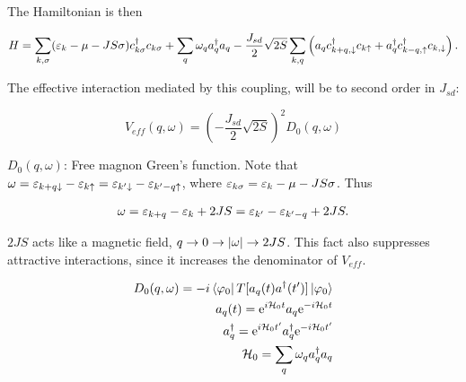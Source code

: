  The Hamiltonian is then
 
 \begin{align*}
 H = \sum_{k,\sigma} (\varepsilon_k - \mu - JS\sigma)c^{\dagger}_{k\sigma} c_{k\sigma} + \sum_q \omega_q a^{\dagger}_q a_q - \frac{J_{sd}}{2}\sqrt{2S}\sum_{k,q} \left( a_q c^{\dagger}_{k+q,\downarrow} c_{k\uparrow} + a^{\dagger}_q c^{\dagger}_{k-q,\uparrow} c_{k,\downarrow}\right).
 \end{align*}
 
 The effective interaction mediated by this coupling, will be to second order in $J_{sd}$:
 
 \begin{center}
 \end{center}
 
 \begin{equation}
 V_{eff}(q,\omega) = \left(-\frac{J_{sd}}{2}\sqrt{2S}\right)^2 D_0(q,\omega)
 \end{equation}
 
 $D_0(q,\omega)$: Free magnon Green's function. Note that $\omega = \varepsilon_{k+q \downarrow} - \varepsilon_{k\uparrow} = \varepsilon_{k' \downarrow} - \varepsilon_{k' - q\uparrow}$, where $\varepsilon_{k\sigma} = \varepsilon_k - \mu - JS\sigma$. Thus 
 
 \begin{align}
 \omega = \varepsilon_{k+q} - \varepsilon_k +2JS = \varepsilon_{k'} - \varepsilon_{k'-q} + 2JS.
 \end{align}
 
 $2JS$ acts like a magnetic field, $q \to 0 \rightarrow \abs{\omega} \to 2JS$. This fact also suppresses attractive interactions, since it increases the denominator of $V_{eff}$. 
 
 \begin{align*}
 D_0(q, \omega) = -i \bra{\varphi_0} T[a_q(t) a^{\dagger}(t')]\ket{\varphi_0} \\ 
 a_q(t) = \mathrm{e}^{i\mathcal{H}_0 t} a_q \mathrm{e}^{-i \mathcal{H}_0 t} \\
 a^{\dagger}_q = \mathrm{e}^{i\mathcal{H}_0 t'} a^{\dagger}_q \mathrm{e}^{-i \mathcal{H}_0 t'} \\
 \mathcal{H}_0 = \sum_q \omega_q a^{\dagger}_q a_q
 \end{align*}
 
